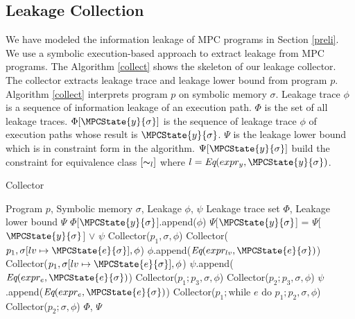 \subsection{Leakage Collection}
We have modeled the information leakage of MPC programs in Section \ref{preli}.
We use a symbolic execution-based approach to extract leakage from MPC programs.
The Algorithm \ref{collect} shows the skeleton of our leakage collector.
The collector extracts leakage trace and leakage lower bound from program $p$.
Algorithm \ref{collect} interprets program $p$ on symbolic memory $\sigma$.
Leakage trace $\phi$ is a sequence of information leakage of an execution path.
$\Phi$ is the set of all leakage traces. $\Phi[\MPCState{y}{\sigma}]$ is the sequence of leakage trace $\phi$ of execution paths whose result is $\MPCState{y}{\sigma}$.
$\Psi$ is the leakage lower bound which is in constraint form in the algorithm.
$\Psi[\MPCState{y}{\sigma}]$ build the constraint for equivalence class $[\thicksim_l]$ where $l=\textit{Eq}(expr_y, \MPCState{y}{\sigma})$.
\begin{algorithm}
    \label{collect}
    \caption{Collector }
    \begin{algorithmic}
    \Require Program $p$, Symbolic memory $\sigma$, Leakage $\phi$, $\psi$
    \Ensure Leakage trace set $\Phi$, Leakage lower bound $\Psi$
        \State $\Phi$[$\MPCState{y}{\sigma}$].append($\phi$)
        \State $\Psi$[$\MPCState{y}{\sigma}$] =  $\Psi$[$\MPCState{y}{\sigma}$] $\lor$ $\psi$
        \State Collector($p_1,\sigma, \phi$)
        \State Collector($p_1,\sigma[lv\mapsto \MPCState{e}{\sigma}], \phi$)
        \State $\phi$.append($\textit{Eq}(expr_{lv},\MPCState{e}{\sigma})$)
        \State Collector($p_1,\sigma[lv\mapsto \MPCState{e}{\sigma}], \phi$)
        \State $\psi$.append($\textit{Eq}(expr_{e},\MPCState{e}{\sigma})$)
            \State Collector($p_1;p_3, \sigma, \phi$)
        \EndIf
            \State Collector($p_2;p_3,\sigma, \phi$)
        \EndIf
        \State $\psi$.append($\textit{Eq}(expr_{e},\MPCState{e}{\sigma})$)
            \State Collector($p_1;\text{while } e \text{ do } p_1; p_2,\sigma,\phi$)
        \Else {}
            \State Collector($p_2;\sigma,\phi$)
        \EndIf
    \EndIf
    \State \Return $\Phi$, $\Psi$
    \end{algorithmic}
\end{algorithm}
